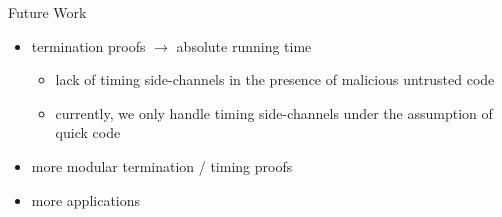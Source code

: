 \documentclass{beamer}
\begin{document}
\begin{frame}{\Huge Future Work}
\Large
\begin{itemize}
  \item termination proofs $\longrightarrow$ absolute running time
  \begin{itemize}\large
    \item lack of timing side-channels in the presence of malicious untrusted code
    \item currently, we only handle timing side-channels under the assumption of quick code
  \end{itemize}
  \item more modular termination / timing proofs
  \item more applications
\end{itemize}
\end{frame}

\end{document}
